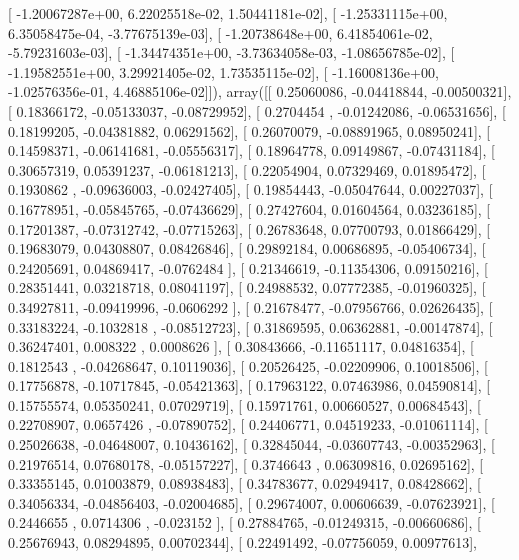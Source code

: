 \documentclass{article}
\begin{document}
       [ -1.20067287e+00,   6.22025518e-02,   1.50441181e-02],
       [ -1.25331115e+00,   6.35058475e-04,  -3.77675139e-03],
       [ -1.20738648e+00,   6.41854061e-02,  -5.79231603e-03],
       [ -1.34474351e+00,  -3.73634058e-03,  -1.08656785e-02],
       [ -1.19582551e+00,   3.29921405e-02,   1.73535115e-02],
       [ -1.16008136e+00,  -1.02576356e-01,   4.46885106e-02]]), array([[ 0.25060086, -0.04418844, -0.00500321],
       [ 0.18366172, -0.05133037, -0.08729952],
       [ 0.2704454 , -0.01242086, -0.06531656],
       [ 0.18199205, -0.04381882,  0.06291562],
       [ 0.26070079, -0.08891965,  0.08950241],
       [ 0.14598371, -0.06141681, -0.05556317],
       [ 0.18964778,  0.09149867, -0.07431184],
       [ 0.30657319,  0.05391237, -0.06181213],
       [ 0.22054904,  0.07329469,  0.01895472],
       [ 0.1930862 , -0.09636003, -0.02427405],
       [ 0.19854443, -0.05047644,  0.00227037],
       [ 0.16778951, -0.05845765, -0.07436629],
       [ 0.27427604,  0.01604564,  0.03236185],
       [ 0.17201387, -0.07312742, -0.07715263],
       [ 0.26783648,  0.07700793,  0.01866429],
       [ 0.19683079,  0.04308807,  0.08426846],
       [ 0.29892184,  0.00686895, -0.05406734],
       [ 0.24205691,  0.04869417, -0.0762484 ],
       [ 0.21346619, -0.11354306,  0.09150216],
       [ 0.28351441,  0.03218718,  0.08041197],
       [ 0.24988532,  0.07772385, -0.01960325],
       [ 0.34927811, -0.09419996, -0.0606292 ],
       [ 0.21678477, -0.07956766,  0.02626435],
       [ 0.33183224, -0.1032818 , -0.08512723],
       [ 0.31869595,  0.06362881, -0.00147874],
       [ 0.36247401,  0.008322  ,  0.0008626 ],
       [ 0.30843666, -0.11651117,  0.04816354],
       [ 0.1812543 , -0.04268647,  0.10119036],
       [ 0.20526425, -0.02209906,  0.10018506],
       [ 0.17756878, -0.10717845, -0.05421363],
       [ 0.17963122,  0.07463986,  0.04590814],
       [ 0.15755574,  0.05350241,  0.07029719],
       [ 0.15971761,  0.00660527,  0.00684543],
       [ 0.22708907,  0.0657426 , -0.07890752],
       [ 0.24406771,  0.04519233, -0.01061114],
       [ 0.25026638, -0.04648007,  0.10436162],
       [ 0.32845044, -0.03607743, -0.00352963],
       [ 0.21976514,  0.07680178, -0.05157227],
       [ 0.3746643 ,  0.06309816,  0.02695162],
       [ 0.33355145,  0.01003879,  0.08938483],
       [ 0.34783677,  0.02949417,  0.08428662],
       [ 0.34056334, -0.04856403, -0.02004685],
       [ 0.29674007,  0.00606639, -0.07623921],
       [ 0.2446655 ,  0.0714306 , -0.023152  ],
       [ 0.27884765, -0.01249315, -0.00660686],
       [ 0.25676943,  0.08294895,  0.00702344],
       [ 0.22491492, -0.07756059,  0.00977613],
\end{document}

